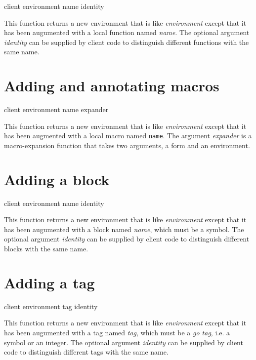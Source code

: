 {\footnotesize
{} {client environment name \optional identity}
}

This function returns a new environment that is like
\textit{environment} except that it has been augumented with a local
function named \textit{name}.  The optional argument \textit{identity}
can be supplied by client code to distinguish different functions with
the same name.

\section{Adding and annotating macros}

{\footnotesize
{} {client environment name expander}
}

This function returns a new environment that is like
\textit{environment} except that it has been augmented with a local
macro named \texttt{name}.  The argument \textit{expander} is a
macro-expansion function that takes two arguments, a form and an
environment.

\section{Adding a block}

{\footnotesize
{} {client environment name \optional identity}
}

This function returns a new environment that is like
\textit{environment} except that it has been augumented with a block
named \textit{name}, which must be a symbol.  The optional argument
\textit{identity} can be supplied by client code to distinguish
different blocks with the same name.

\section{Adding a tag}

{\footnotesize
{} {client environment tag \optional identity}
}

This function returns a new environment that is like
\textit{environment} except that it has been augumented with a tag
named \textit{tag}, which must be a \emph{go tag}, i.e. a symbol or an
integer.  The optional argument \textit{identity} can be supplied by
client code to distinguish different tags with the same name.
